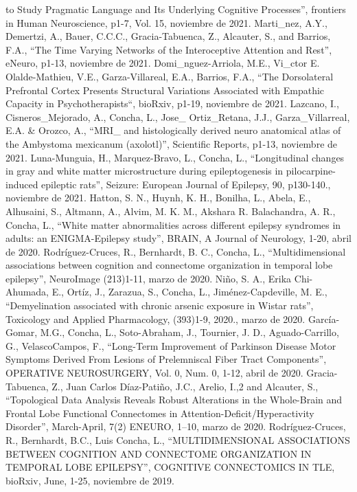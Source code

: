 to Study Pragmatic Language and Its Underlying Cognitive Processes”, frontiers in Human Neuroscience, p1-7, Vol. 15,  noviembre de 2021.
Marti_nez, A.Y., Demertzi, A., Bauer, C.C.C., Gracia-Tabuenca, Z., Alcauter, S., and Barrios, F.A., “The Time Varying Networks of the Interoceptive 
Attention and Rest”, eNeuro, p1-13,  noviembre de 2021.
Domi_nguez-Arriola, M.E., Vi_ctor E. Olalde-Mathieu, V.E., Garza-Villareal, E.A., Barrios, F.A., “The Dorsolateral Prefrontal Cortex Presents Structural 
Variations Associated with Empathic Capacity in Psychotherapists“, bioRxiv, p1-19,  noviembre de 2021.
Lazcano, I., Cisneros_Mejorado, A., Concha, L., Jose_ Ortiz_Retana, J.J., Garza_Villarreal, E.A. & Orozco, A., “MRI_ and histologically derived neuro 
anatomical atlas of the Ambystoma mexicanum (axolotl)”, Scientific Reports, p1-13,  noviembre de 2021.
Luna-Munguia, H., Marquez-Bravo, L., Concha, L., “Longitudinal changes in gray and white matter microstructure during epileptogenesis in pilocarpine-induced 
epileptic rats”, Seizure: European Journal of Epilepsy, 90, p130-140.,  noviembre de 2021.
Hatton, S. N., Huynh, K. H., Bonilha, L., Abela, E., Alhusaini, S., Altmann, A., Alvim, M. K. M., Akshara R. Balachandra, A. R., Concha, L., “White matter 
abnormalities across different epilepsy syndromes in adults: an ENIGMA-Epilepsy study”, BRAIN, A Journal of Neurology, 1-20,  abril de 2020.
Rodríguez-Cruces, R., Bernhardt, B. C., Concha, L., “Multidimensional associations between cognition and connectome organization in temporal lobe epilepsy”, 
NeuroImage (213)1-11,  marzo de 2020.
Niño, S. A., Erika Chi-Ahumada, E., Ortíz, J., Zarazua, S., Concha, L., Jiménez-Capdeville, M. E., “Demyelination associated with chronic arsenic exposure 
in Wistar rats”, Toxicology and Applied Pharmacology, (393)1-9, 2020.,  marzo de 2020.
García-Gomar, M.G., Concha, L., Soto-Abraham, J., Tournier, J. D., Aguado-Carrillo, G., VelascoCampos, F., “Long-Term Improvement of Parkinson Disease Motor 
Symptoms Derived From Lesions of Prelemniscal Fiber Tract Components”, OPERATIVE NEUROSURGERY, Vol. 0, Num. 0, 1-12,  abril de 2020.
Gracia-Tabuenca, Z., Juan Carlos Díaz-Patiño, J.C., Arelio, I.,2 and Alcauter, S., “Topological Data Analysis Reveals Robust Alterations in the Whole-Brain 
and Frontal Lobe Functional Connectomes in Attention-Deficit/Hyperactivity Disorder”, March-April, 7(2) ENEURO, 1–10,  marzo de 2020.
Rodríguez-Cruces, R., Bernhardt, B.C., Luis Concha, L., “MULTIDIMENSIONAL ASSOCIATIONS BETWEEN COGNITION AND CONNECTOME ORGANIZATION IN TEMPORAL LOBE 
EPILEPSY”, COGNITIVE CONNECTOMICS IN TLE, bioRxiv, June, 1-25,  noviembre de 2019.
